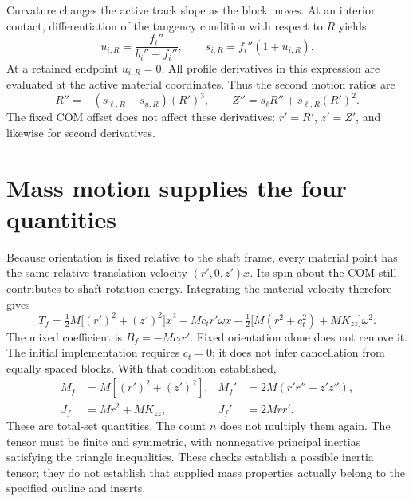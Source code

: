 \documentclass[11pt,letterpaper]{article}
\numberwithin{equation}{section}
\newcommand{\half}{\tfrac12}
\begin{document}
Curvature changes the active track slope as the block moves. At an interior
contact, differentiation of the tangency condition with respect to $R$ yields
\begin{equation}
 u_{i,R}=\frac{f_i''}{b_i''-f_i''},\qquad
 s_{i,R}=f_i''(1+u_{i,R}).
 \label{eq:contact-migration}
\end{equation}
At a retained endpoint $u_{i,R}=0$. All profile derivatives in this expression
are evaluated at the active material coordinates. Thus the second motion
ratios are
\begin{equation}
 R''=-(s_{\ell,R}-s_{u,R})(R')^3,\qquad
 Z''=s_\ell R''+s_{\ell,R}(R')^2.
 \label{eq:second}
\end{equation}
The fixed COM offset does not affect these derivatives: $r'=R'$, $z'=Z'$,
and likewise for second derivatives.

\section{Mass motion supplies the four quantities}
\label{sec:inertia}

Because orientation is fixed relative to the shaft frame, every material point
has the same relative translation velocity $(r',0,z')\dot x$. Its spin about
the COM still contributes to shaft-rotation energy. Integrating the material
velocity therefore gives
\begin{equation}
 T_f=\half M\bigl[(r')^2+(z')^2\bigr]\dot x^2
       -M c_t r'\omega\dot x
       +\half\bigl[M(r^2+c_t^2)+M K_{zz}\bigr]\omega^2.
\end{equation}
The mixed coefficient is $B_f=-M c_t r'$. Fixed orientation alone does not
remove it. The initial implementation requires $c_t=0$; it does not infer
cancellation from equally spaced blocks. With that condition established,
\begin{equation}
\boxed{\begin{aligned}
 M_f&=M[(r')^2+(z')^2],&
 M_f'&=2M(r'r''+z'z''),\\
 J_f&=Mr^2+M K_{zz},& J_f'&=2Mrr'.
\end{aligned}}
\label{eq:maps}
\end{equation}
These are total-set quantities. The count $n$ does not multiply them again.
The tensor must be finite and symmetric, with nonnegative principal inertias
satisfying the triangle inequalities. These checks establish a possible
inertia tensor; they do not establish that supplied mass properties actually
belong to the specified outline and inserts.
\end{document}
